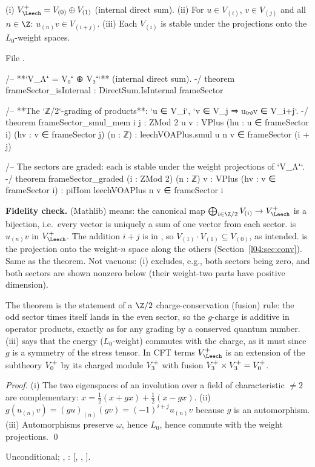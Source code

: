 \begin{theorem}[$V_\Leech^+=\chelVz\oplus\chelVt$, and the $\Z/2$-grading of products]\label{ch11:thm:sectors}
(i) $V_\Leech^+=V_{(0)}\oplus V_{(1)}$ (internal direct sum).
(ii) For $u\in V_{(i)}$, $v\in V_{(j)}$ and all $n\in\Z$: $u_{(n)}v\in V_{(i+j)}$.
(iii) Each $V_{(i)}$ is stable under the projections onto the $L_0$-weight spaces.
\end{theorem}
\noindent File .
\begin{leancode}
/-- **`V_Λ⁺ = V₀⁺ ⊕ V₃⁺`** (internal direct sum). -/
theorem frameSector_isInternal : DirectSum.IsInternal frameSector

/-- **The `ℤ/2`-grading of products**: `u ∈ V_i`, `v ∈ V_j ⇒ u₍ₙ₎v ∈ V_{i+j}`. -/
theorem frameSector_smul_mem {i j : ZMod 2} {u v : VPlus} (hu : u ∈ frameSector i)
    (hv : v ∈ frameSector j) (n : ℤ) : leechVOAPlus.smul u n v ∈ frameSector (i + j)

/-- The sectors are graded: each is stable under the weight projections of `V_Λ⁺`. -/
theorem frameSector_graded (i : ZMod 2) (n : ℤ) {v : VPlus} (hv : v ∈ frameSector i) :
    piHom leechVOAPlus n v ∈ frameSector i
\end{leancode}
\begin{dictionary}
\textbf{Fidelity check.}   (Mathlib) means: the canonical
map $\bigoplus_{i\in\Z/2}V_{(i)}\to V_\Leech^+$ is a bijection, i.e.\ every vector is uniquely a sum
of one vector from each sector.   is $u_{(n)}v$ in $V_\Leech^+$.  The
addition $i+j$ is in , so $V_{(1)}\cdot V_{(1)}\subseteq V_{(0)}$, as intended.
 is the projection onto the weight-$n$ space along the others
(Section~\ref{l04:sec:conv}).  Same as the theorem.  Not vacuous: (i) excludes, e.g., both sectors being
zero, and both sectors are shown nonzero below (their weight-two parts have positive dimension).
\end{dictionary}

\begin{physics}
The theorem is the statement of a $\Z/2$ charge-conservation (fusion) rule: the odd sector times itself lands in the even sector, so the $g$-charge is additive in operator products, exactly as for any grading by a conserved quantum number. (iii) says that the energy ($L_0$-weight) commutes with the charge, as it must since $g$ is a symmetry of the stress tensor. In CFT terms $V_\Leech^+$ is an extension of the subtheory $V_0^{+}$ by its charged module $V_3^{+}$ with fusion $V_3^{+}\times V_3^{+}=V_0^{+}$.
\end{physics}
\emph{Proof.}  (i) The two eigenspaces of an involution over a field of characteristic $\ne2$ are
complementary: $x=\tfrac12(x+gx)+\tfrac12(x-gx)$.  (ii) $g(u_{(n)}v)=(gu)_{(n)}(gv)=(-1)^{i+j}
u_{(n)}v$ because $g$ is an automorphism.  (iii) Automorphisms preserve $\omega$, hence $L_0$, hence
commute with the weight projections. \qed
\begin{status}Unconditional; ,
: [, , ].
\end{status}

